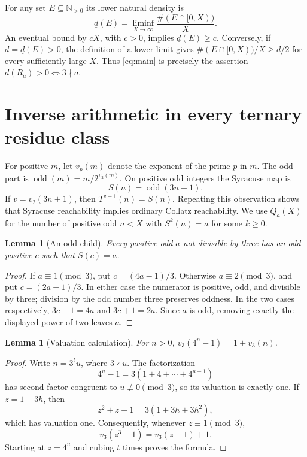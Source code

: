 \documentclass[11pt]{article}
\newtheorem{lemma}[theorem]{Lemma}
\newcommand{\N}{\mathbb N}
\begin{document}
For any set $E\subseteq\N_{>0}$ its lower natural density is
\[
 \underline d(E)=\liminf_{X\to\infty}\frac{\#(E\cap[0,X))}{X}.
\]
An eventual bound by $cX$, with $c>0$, implies $\underline d(E)\ge c$.
Conversely, if $d=\underline d(E)>0$, the definition of a lower limit
gives $\#(E\cap[0,X))/X\ge d/2$ for every sufficiently large $X$.
Thus \eqref{eq:main} is precisely the assertion
$\underline d(R_a)>0\iff3\nmid a$.

\section{Inverse arithmetic in every ternary residue class}
For positive $m$, let $v_p(m)$ denote the exponent of the prime $p$ in $m$.
The odd part is $\operatorname{odd}(m)=m/2^{v_2(m)}$. On positive odd
integers the Syracuse map is
\begin{equation}\label{eq:S}
 S(n)=\operatorname{odd}(3n+1).
\end{equation}
If $v=v_2(3n+1)$, then $T^{v+1}(n)=S(n)$. Repeating this observation
shows that Syracuse reachability implies ordinary Collatz reachability.
We use $Q_a(X)$ for the number of positive odd $n<X$ with $S^k(n)=a$
for some $k\ge0$.

\begin{lemma}[An odd child]\label{lem:child}
Every positive odd $a$ not divisible by three has an odd positive $c$
such that $S(c)=a$.
\end{lemma}
\begin{proof}
If $a\equiv1\pmod3$, put $c=(4a-1)/3$. Otherwise $a\equiv2\pmod3$,
and put $c=(2a-1)/3$. In either case the numerator is positive, odd,
and divisible by three; division by the odd number three preserves
oddness. In the two cases respectively,
$3c+1=4a$ and $3c+1=2a$. Since $a$ is odd, removing exactly the displayed
power of two leaves $a$.
\end{proof}

\begin{lemma}[Valuation calculation]\label{lem:valuation}
For $n>0$, $v_3(4^n-1)=1+v_3(n)$.
\end{lemma}
\begin{proof}
Write $n=3^t u$, where $3\nmid u$. The factorization
\[
 4^u-1=3(1+4+\cdots+4^{u-1})
\]
has second factor congruent to $u\not\equiv0\pmod3$, so its valuation
is exactly one. If $z=1+3h$, then
\[
 z^2+z+1=3(1+3h+3h^2),
\]
which has valuation one. Consequently, whenever $z\equiv1\pmod3$,
\[
 v_3(z^3-1)=v_3(z-1)+1.
\]
Starting at $z=4^u$ and cubing $t$ times proves the formula.
\end{proof}
\end{document}
